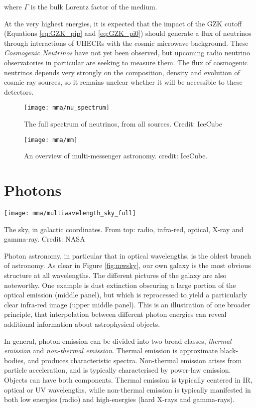 where $\Gamma$ is the bulk Lorentz factor of the medium.

At the very highest energies, it is expected that the impact of the GZK cutoff (Equations \ref{eq:GZK_pip} and \ref{eq:GZK_pi0}) should generate a flux of neutrinos through interactions of UHECRs with the cosmic microwave background. These \emph{Cosmogenic Neutrinos} have not yet been observed, but upcoming radio neutrino observatories in particular are seeking to measure them. The flux of cosmogenic neutrinos depends very strongly on the composition, density and evolution of cosmic ray sources, so it remains unclear whether it will be accessible to these detectors.

\begin{figure}[!ht]
	\texttt{[image: mma/nu\_spectrum]}
	\caption{The full spectrum of neutrinos, from all sources. Credit: IceCube}
	\label{fig:nu_spectrum}
\end{figure}

\begin{figure}[!ht]
	\centering \texttt{[image: mma/mm]}
	\caption{An overview of multi-messenger astronomy. credit: IceCube.}
	\label{fig:mm}
\end{figure}

\section{Photons}

\begin{marginfigure}
	\texttt{[image: mma/multiwavelength\_sky\_full]}
	\caption{The sky, in galactic coordinates. From top: radio, infra-red, optical, X-ray and gamma-ray. Credit: NASA}
	\label{fig:mwsky}
\end{marginfigure}

Photon astronomy, in particular that in optical wavelengths, is the oldest branch of astronomy. As clear in Figure \ref{fig:mwsky}, our own galaxy is the most obvious structure at all wavelengths. The different pictures of the galaxy are also noteworthy. One example is dust extinction obscuring a large portion of the optical emission (middle panel), but  which is reprocessed to yield a particularly clear infra-red image (upper middle panel). This is an illustration of one broader principle, that interpolation between different photon energies can reveal additional information about astrophysical objects.

In general, photon emission can be divided into two broad classes, \emph{thermal emission}
 and \emph{non-thermal emission}. Thermal emission is approximate black-bodies, and produces characteristic spectra. Non-thermal emission arises from particle acceleration, and is typically characterised by power-law emission. Objects can have both components. Thermal emission is typically centered in IR, optical or UV wavelengths, while non-thermal emission is typically manifested in both low energies (radio) and high-energies (hard X-rays and gamma-rays).
 
